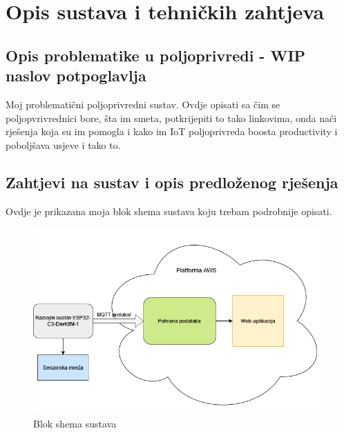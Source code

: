 \chapter{Opis sustava i tehničkih zahtjeva}

\section{Opis problematike u poljoprivredi - WIP naslov potpoglavlja}

Moj problematični poljoprivredni sustav. Ovdje opisati sa čim se poljopvrivrednici bore, šta im smeta, potkrijepiti to tako linkovima, onda naći rješenja koja su im pomogla i kako im IoT poljoprivreda boosta productivity i poboljšava usjeve i tako to. 

\section{Zahtjevi na sustav i opis predloženog rješenja}

Ovdje je prikazana moja blok shema sustava koju trebam podrobnije opisati. 

\begin{figure}[ht]
	\includegraphics[width=\linewidth]{imgs/shema}
	\caption{Blok shema sustava}
	\label{fig:shema}
\end{figure}

